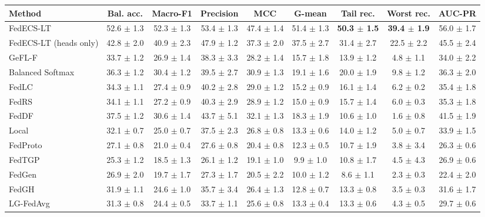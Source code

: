 \begin{tabular}{lcccccccc}
\toprule
Method & Bal. acc. & Macro-F1 & Precision & MCC & G-mean & Tail rec. & Worst rec. & AUC-PR\\
\midrule
FedECS-LT & 52.6 $\pm$ 1.3 & 52.3 $\pm$ 1.3 & 53.4 $\pm$ 1.3 & 47.4 $\pm$ 1.4 & 51.4 $\pm$ 1.3 & \textbf{50.3 $\pm$ 1.5} & \textbf{39.4 $\pm$ 1.9} & 56.0 $\pm$ 1.7\\
FedECS-LT (heads only) & 42.8 $\pm$ 2.0 & 40.9 $\pm$ 2.3 & 47.9 $\pm$ 1.2 & 37.3 $\pm$ 2.0 & 37.5 $\pm$ 2.7 & 31.4 $\pm$ 2.7 & 22.5 $\pm$ 2.2 & 45.5 $\pm$ 2.4\\
GeFL-F & 33.7 $\pm$ 1.2 & 26.9 $\pm$ 1.4 & 38.3 $\pm$ 3.3 & 28.2 $\pm$ 1.4 & 15.7 $\pm$ 1.8 & 13.9 $\pm$ 1.2 & 4.8 $\pm$ 1.1 & 34.0 $\pm$ 2.2\\
Balanced Softmax & 36.3 $\pm$ 1.2 & 30.4 $\pm$ 1.2 & 39.5 $\pm$ 2.7 & 30.9 $\pm$ 1.3 & 19.1 $\pm$ 1.6 & 20.0 $\pm$ 1.9 & 9.8 $\pm$ 1.2 & 36.3 $\pm$ 2.0\\
FedLC & 34.3 $\pm$ 1.1 & 27.4 $\pm$ 0.9 & 40.2 $\pm$ 2.8 & 29.0 $\pm$ 1.2 & 15.2 $\pm$ 0.9 & 16.1 $\pm$ 1.4 & 6.2 $\pm$ 0.2 & 35.4 $\pm$ 1.8\\
FedRS & 34.1 $\pm$ 1.1 & 27.2 $\pm$ 0.9 & 40.3 $\pm$ 2.9 & 28.9 $\pm$ 1.2 & 15.0 $\pm$ 0.9 & 15.7 $\pm$ 1.4 & 6.0 $\pm$ 0.3 & 35.3 $\pm$ 1.8\\
FedDF & 37.5 $\pm$ 1.2 & 30.6 $\pm$ 1.4 & 43.7 $\pm$ 5.1 & 32.1 $\pm$ 1.3 & 18.3 $\pm$ 1.9 & 10.6 $\pm$ 1.0 & 1.6 $\pm$ 0.8 & 41.5 $\pm$ 1.9\\
Local & 32.1 $\pm$ 0.7 & 25.0 $\pm$ 0.7 & 37.5 $\pm$ 2.3 & 26.8 $\pm$ 0.8 & 13.3 $\pm$ 0.6 & 14.0 $\pm$ 1.2 & 5.0 $\pm$ 0.7 & 33.9 $\pm$ 1.5\\
FedProto & 27.1 $\pm$ 0.8 & 21.0 $\pm$ 0.4 & 27.6 $\pm$ 0.8 & 20.4 $\pm$ 0.8 & 12.3 $\pm$ 0.5 & 10.7 $\pm$ 1.9 & 3.8 $\pm$ 3.4 & 26.3 $\pm$ 0.6\\
FedTGP & 25.3 $\pm$ 1.2 & 18.5 $\pm$ 1.3 & 26.1 $\pm$ 1.2 & 19.1 $\pm$ 1.0 & 9.9 $\pm$ 1.0 & 10.8 $\pm$ 1.7 & 4.5 $\pm$ 4.3 & 26.9 $\pm$ 0.6\\
FedGen & 26.9 $\pm$ 2.0 & 19.7 $\pm$ 1.7 & 27.3 $\pm$ 1.7 & 20.5 $\pm$ 2.2 & 10.0 $\pm$ 1.2 & 8.6 $\pm$ 1.1 & 2.3 $\pm$ 0.3 & 22.4 $\pm$ 2.0\\
FedGH & 31.9 $\pm$ 1.1 & 24.6 $\pm$ 1.0 & 35.7 $\pm$ 3.4 & 26.4 $\pm$ 1.3 & 12.8 $\pm$ 0.7 & 13.3 $\pm$ 0.8 & 3.5 $\pm$ 0.3 & 31.6 $\pm$ 1.7\\
LG-FedAvg & 31.3 $\pm$ 0.8 & 24.4 $\pm$ 0.5 & 33.7 $\pm$ 1.1 & 25.6 $\pm$ 0.8 & 13.3 $\pm$ 0.4 & 13.3 $\pm$ 0.6 & 4.3 $\pm$ 0.5 & 29.7 $\pm$ 0.6\\

\end{tabular}
